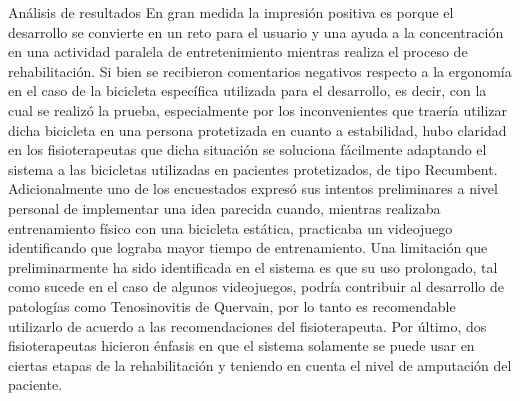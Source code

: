 \begin{thesischapter}{3} {Análisis de resultados}
    \vspace{10pt}
    En gran medida la impresión positiva
    es porque el desarrollo se convierte en un
    reto para el usuario y una ayuda a la
    concentración en una actividad paralela de
    entretenimiento mientras realiza el proceso de
    rehabilitación.
    Si bien se recibieron comentarios negativos
    respecto a la ergonomía en el caso de
    la bicicleta específica utilizada para el
    desarrollo, es decir, con la cual se realizó la
    prueba, especialmente por los inconvenientes
    que traería utilizar dicha bicicleta en una
    persona protetizada en cuanto a estabilidad,
    hubo claridad en los fisioterapeutas que dicha
    situación se soluciona fácilmente adaptando
    el sistema a las bicicletas utilizadas en
    pacientes protetizados, de tipo Recumbent.
    Adicionalmente uno de los encuestados
    expresó sus intentos preliminares a nivel
    personal de implementar una idea parecida
    cuando, mientras realizaba entrenamiento
    físico con una bicicleta estática, practicaba un
    videojuego identificando que lograba mayor
    tiempo de entrenamiento. Una limitación
    que preliminarmente ha sido identificada en
    el sistema es que su uso prolongado, tal como
    sucede en el caso de algunos videojuegos,
    podría contribuir al desarrollo de patologías
    como Tenosinovitis de Quervain, por lo tanto
    es recomendable utilizarlo de acuerdo a las
    recomendaciones del fisioterapeuta.
    Por último, dos fisioterapeutas hicieron
    énfasis en que el sistema solamente se puede
    usar en ciertas etapas de la rehabilitación y
    teniendo en cuenta el nivel de amputación del
    paciente.


\end{thesischapter}